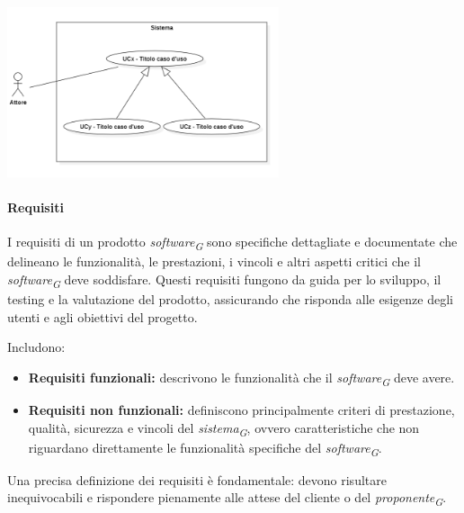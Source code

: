 \begin{itemize}
\begin{itemize}
        \vspace{0.6cm}

        \begin{minipage}[H]{\linewidth}
            \centering
            \includegraphics[width=0.6\textwidth]{../Images/NormeDiProgetto/GeneralizzazioneUC.PNG}
        \end{minipage}
    \end{itemize}
\end{itemize}

\vspace{0.2cm}

\paragraph{Requisiti}
I requisiti di un prodotto \textit{software}\textsubscript{\textit{G}} sono specifiche dettagliate e documentate che delineano le funzionalità, le prestazioni, i vincoli e altri aspetti critici che il \textit{software}\textsubscript{\textit{G}} deve soddisfare. Questi requisiti fungono da guida per lo sviluppo, il testing e la valutazione del prodotto, assicurando che risponda alle esigenze degli utenti e agli obiettivi del progetto.

Includono:

\begin{itemize}
    \item \textbf{Requisiti funzionali:} descrivono le funzionalità che il \textit{software}\textsubscript{\textit{G}} deve avere.
    \item \textbf{Requisiti non funzionali:} definiscono principalmente criteri di prestazione, qualità, sicurezza e vincoli del \textit{sistema}\textsubscript{\textit{G}}, ovvero caratteristiche che non riguardano direttamente le funzionalità specifiche del \textit{software}\textsubscript{\textit{G}}.
\end{itemize}

Una precisa definizione dei requisiti è fondamentale: devono risultare inequivocabili e rispondere pienamente alle attese del cliente o del \textit{proponente}\textsubscript{\textit{G}}.
\pagebreak

